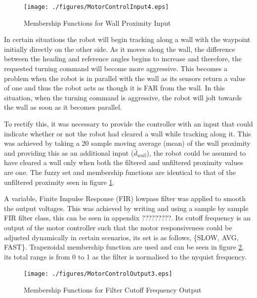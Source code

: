 \documentclass[10pt]{article}
\begin{document}
\begin{figure}[H]
    \centering
\texttt{[image: ./figures/MotorControlInput4.eps]}
\caption{Membership Functions for Wall Proximity Input}
\label{fig:wallProx}
\end{figure}

In certain situations the robot will begin tracking along a wall with the waypoint initially directly on the other side. 
As it moves along the wall, the difference between the heading and reference angles begins to increase and therefore, the requested turning command will become more aggressive. 
This becomes a problem when the robot is in parallel with the wall as its sensors return a value of one and thus the robot acts as though it is FAR from the wall.
In this situation, when the turning command is aggressive, the robot will jolt towards the wall as soon as it becomes parallel. 

\medskip
To rectify this, it was necessary to provide the controller with an input that could indicate whether or not the robot had cleared a wall while tracking along it. 
This was achieved by taking a 20 sample moving average (mean) of the wall proximity and providing this as an additional input ($\bar{d}_{wall}$), the robot could be assumed to have cleared a wall only when both the filtered and unfiltered proximity values are one.
The fuzzy set and membership functions are identical to that of the unfiltered proximity seen in figure \ref{fig:wallProx}.

\medskip
A variable, Finite Impulse Response (FIR) lowpass filter was applied to smooth the output voltages.
This was achieved by writing and using a sample by sample FIR filter class, this can be seen in appendix ?????????.
Its cutoff frequency is an output of the motor controller such that the motor responsiveness could be adjusted dynamically in certain scenarios, its set is as follows, \{SLOW, AVG, FAST\}.
Trapezoidal membership function are used and can be seen in figure \ref{fig:filterOut}, its total range is from 0 to 1 as the filter is normalised to the nyquist frequency. 



\begin{figure}[H]
    \centering
\texttt{[image: ./figures/MotorControlOutput3.eps]}
\caption{Membership Functions for Filter Cutoff Frequency Output}
\label{fig:filterOut}
\end{figure}
\end{document}
